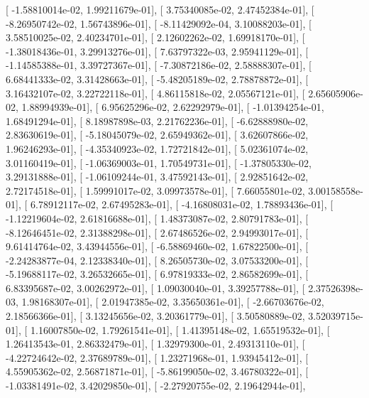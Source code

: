 \documentclass{article}
\begin{document}
       [ -1.58810014e-02,   1.99211679e-01],
       [  3.75340085e-02,   2.47452384e-01],
       [ -8.26950742e-02,   1.56743896e-01],
       [ -8.11429092e-04,   3.10088203e-01],
       [  3.58510025e-02,   2.40234701e-01],
       [  2.12602262e-02,   1.69918170e-01],
       [ -1.38018436e-01,   3.29913276e-01],
       [  7.63797322e-03,   2.95941129e-01],
       [ -1.14585388e-01,   3.39727367e-01],
       [ -7.30872186e-02,   2.58888307e-01],
       [  6.68441333e-02,   3.31428663e-01],
       [ -5.48205189e-02,   2.78878872e-01],
       [  3.16432107e-02,   3.22722118e-01],
       [  4.86115818e-02,   2.05567121e-01],
       [  2.65605906e-02,   1.88994939e-01],
       [  6.95625296e-02,   2.62292979e-01],
       [ -1.01394254e-01,   1.68491294e-01],
       [  8.18987898e-03,   2.21762236e-01],
       [ -6.62888980e-02,   2.83630619e-01],
       [ -5.18045079e-02,   2.65949362e-01],
       [  3.62607866e-02,   1.96246293e-01],
       [ -4.35340923e-02,   1.72721842e-01],
       [  5.02361074e-02,   3.01160419e-01],
       [ -1.06369003e-01,   1.70549731e-01],
       [ -1.37805330e-02,   3.29131888e-01],
       [ -1.06109244e-01,   3.47592143e-01],
       [  2.92851642e-02,   2.72174518e-01],
       [  1.59991017e-02,   3.09973578e-01],
       [  7.66055801e-02,   3.00158558e-01],
       [  6.78912117e-02,   2.67495283e-01],
       [ -4.16808031e-02,   1.78893436e-01],
       [ -1.12219604e-02,   2.61816688e-01],
       [  1.48373087e-02,   2.80791783e-01],
       [ -8.12646451e-02,   2.31388298e-01],
       [  2.67486526e-02,   2.94993017e-01],
       [  9.61414764e-02,   3.43944556e-01],
       [ -6.58869460e-02,   1.67822500e-01],
       [ -2.24283877e-04,   2.12338340e-01],
       [  8.26505730e-02,   3.07533200e-01],
       [ -5.19688117e-02,   3.26532665e-01],
       [  6.97819333e-02,   2.86582699e-01],
       [  6.83395687e-02,   3.00262972e-01],
       [  1.09030040e-01,   3.39257788e-01],
       [  2.37526398e-03,   1.98168307e-01],
       [  2.01947385e-02,   3.35650361e-01],
       [ -2.66703676e-02,   2.18566366e-01],
       [  3.13245656e-02,   3.20361779e-01],
       [  3.50580889e-02,   3.52039715e-01],
       [  1.16007850e-02,   1.79261541e-01],
       [  1.41395148e-02,   1.65519532e-01],
       [  1.26413543e-01,   2.86332479e-01],
       [  1.32979300e-01,   2.49313110e-01],
       [ -4.22724642e-02,   2.37689789e-01],
       [  1.23271968e-01,   1.93945412e-01],
       [  4.55905362e-02,   2.56871871e-01],
       [ -5.86199050e-02,   3.46780322e-01],
       [ -1.03381491e-02,   3.42029850e-01],
       [ -2.27920755e-02,   2.19642944e-01],
\end{document}

